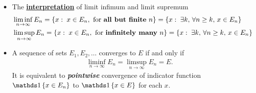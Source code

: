 \documentclass[11pt]{article}
\begin{document}
\begin{itemize}
\item \begin{proposition} The \underline{\textbf{interpretation}} of limit infimum and limit supremum
\begin{align*}
&\liminf\limits_{n\rightarrow \infty}E_{n} = \left\{x: \; x\in E_{n}, \text{ for \textbf{all but finite} }n \right\} = \left\{x: \; \exists k,\, \forall n\ge k, \, x\in E_{n} \right\}\\
&\limsup\limits_{n\rightarrow \infty}E_{n} = \left\{x: \; x\in E_{n}, \text{ for \textbf{infinitely many} }n \right\}  = \left\{x: \; \exists k,\, \forall n\ge k, \, x\in E_{n} \right\}
\end{align*}
\end{proposition}

\item \begin{remark}
A sequence of sets $E_1, E_2, \ldots$ converges to $E$ if and only if 
\begin{align*}
\liminf\limits_{n\rightarrow \infty}E_{n} = \limsup\limits_{n\rightarrow \infty}E_{n} = E.
\end{align*} It is equivalent to \emph{\textbf{pointwise}} convergence of indicator function $\ind{x \in E_n}$ to $\ind{x \in E}$ for each $x$.

\end{remark}
\end{itemize}
\end{document}
